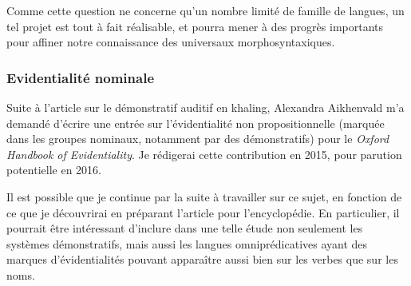 \documentclass[oldfontcommands,oneside,a4paper,11pt]{article}
\begin{document}
Comme cette question ne concerne qu'un nombre limité de famille de langues, un tel projet est tout à fait réalisable, et pourra mener à des progrès importants pour affiner notre connaissance des universaux morphosyntaxiques.

\subsubsection{Evidentialité nominale}
Suite à l'article \citet{jacques14auditory} sur le démonstratif auditif en khaling, Alexandra Aikhenvald m'a demandé d'écrire une entrée sur l'évidentialité non propositionnelle (marquée dans les groupes nominaux, notamment par des démonstratifs) pour le \textit{Oxford Handbook of Evidentiality}. Je rédigerai cette contribution en 2015, pour parution potentielle en 2016.

Il est possible que je continue par la suite à travailler sur ce sujet, en fonction de ce que je découvrirai en préparant l'article pour l'encyclopédie. En particulier, il pourrait être intéressant d'inclure dans une telle étude non seulement les systèmes démonstratifs, mais aussi les langues omniprédicatives ayant des marques d'évidentialités pouvant apparaître aussi bien sur les verbes que sur les noms.
\end{document}
